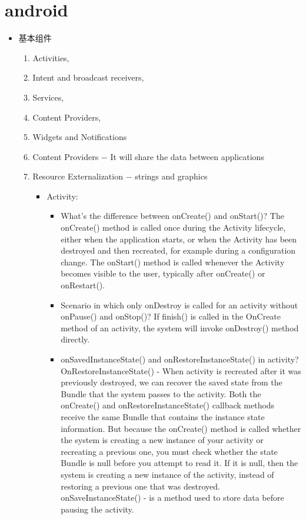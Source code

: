 \documentclass[11pt]{article}
\begin{document}
\section{android}
\label{sec:org387e330}
\begin{itemize}
\item 基本组件
\begin{enumerate}
\item Activities,
\item Intent and broadcast receivers,
\item Services,
\item Content Providers,
\item Widgets and Notifications
\item Content Providers − It will share the data between applications
\item Resource Externalization − strings and graphics

\begin{itemize}
\item Activity:
\begin{itemize}
\item What’s the difference between onCreate() and onStart()?
The onCreate() method is called once during the Activity lifecycle, either when the application starts, or when the Activity has been destroyed and then recreated, for example during a configuration change.
The onStart() method is called whenever the Activity becomes visible to the user, typically after onCreate() or onRestart().
\item Scenario in which only onDestroy is called for an activity without onPause() and onStop()?
If finish() is called in the OnCreate method of an activity, the system will invoke onDestroy() method directly.

\item onSavedInstanceState() and onRestoreInstanceState() in activity?
OnRestoreInstanceState() - When activity is recreated after it was previously destroyed, we can recover the saved state from the Bundle that the system passes to the activity. Both the onCreate() and onRestoreInstanceState() callback methods receive the same Bundle that contains the instance state information. But because the onCreate() method is called whether the system is creating a new instance of your activity or recreating a previous one, you must check whether the state Bundle is null before you attempt to read it. If it is null, then the system is creating a new instance of the activity, instead of restoring a previous one that was destroyed.
onSaveInstanceState() - is a method used to store data before pausing the activity.


\end{itemize}
\end{itemize}
\end{enumerate}
\end{itemize}
\end{document}
